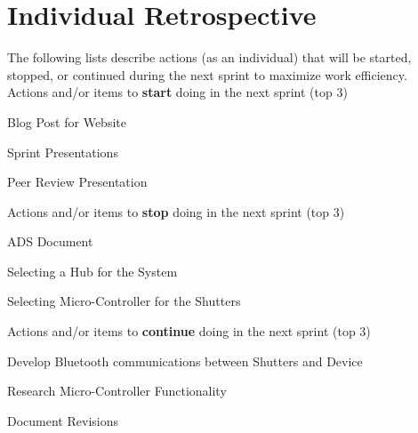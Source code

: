 \documentclass{article}
\begin{document}
\pagebreak

\section{Individual Retrospective}
The following lists describe actions (as an individual) that will be started, stopped, or continued during the next sprint to maximize work efficiency. \\

Actions and/or items to \textbf{start} doing in the next sprint (top 3)
\begin{itemize}
\begin{item}
Blog Post for Website
\end{item}
\begin{item}
Sprint Presentations
\end{item}
\begin{item}
Peer Review Presentation
\end{item}
\end{itemize}

Actions and/or items to \textbf{stop} doing in the next sprint (top 3)
\begin{itemize}
\begin{item}
ADS Document
\end{item}
\begin{item}
Selecting a Hub for the System
\end{item}
\begin{item}
Selecting Micro-Controller for the Shutters
\end{item}
\end{itemize}

Actions and/or items to \textbf{continue} doing in the next sprint (top 3)
\begin{itemize}
\begin{item}
Develop Bluetooth communications between Shutters and Device
\end{item}
\begin{item}
Research Micro-Controller Functionality 
\end{item}
\begin{item}
Document Revisions
\end{item}
\end{itemize}
\end{document}
